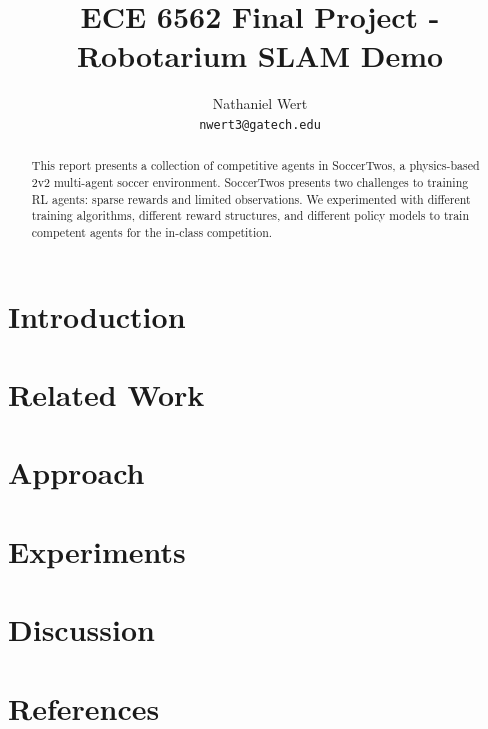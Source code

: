 \documentclass{article}
\title{ECE 6562 Final Project - Robotarium SLAM Demo}
\author{
    Nathaniel Wert \\
    \texttt{nwert3@gatech.edu} \\
}
\begin{document}
\maketitle

\begin{abstract}
    This report presents a collection of competitive agents in SoccerTwos, a physics-based 2v2 multi-agent soccer environment. SoccerTwos presents two challenges to training RL agents: sparse rewards and limited observations. We experimented with different training algorithms, different reward structures, and different policy models to train competent agents for the in-class competition.
\end{abstract}

\section{Introduction}


\section{Related Work}


\section{Approach}


\section{Experiments}


\section{Discussion}


\section{References}

\end{document}
